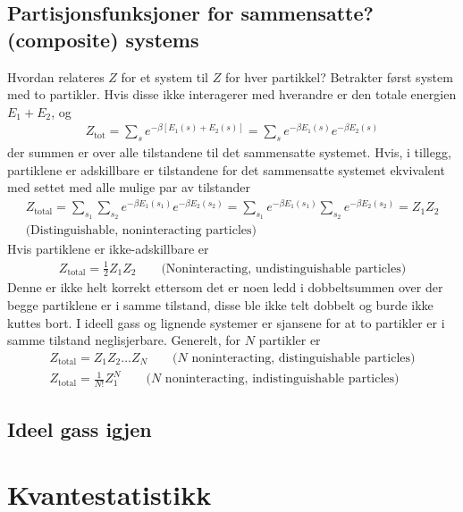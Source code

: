 \documentclass[12pt]{article}
\begin{document}
\subsection{Partisjonsfunksjoner for sammensatte? (composite) systems}
Hvordan relateres $Z$ for et system til $Z$ for hver partikkel? Betrakter først system med
to partikler. Hvis disse ikke interagerer med hverandre er den totale energien $E_1 + E_2$, og
\begin{align*}
  Z_\text{tot} = \sum_s e^{-\beta[E_1(s) + E_2(s)]} = \sum_s e^{-\beta E_1(s)} e^{-\beta E_2(s)}
\end{align*}
der summen er over alle tilstandene til det sammensatte systemet. Hvis, i tillegg,
partiklene er adskillbare er tilstandene for det sammensatte systemet ekvivalent med
settet med alle mulige par av tilstander
\begin{align*}
  Z_\text{total} = \sum_{s_1}\sum_{s_2} e^{-\beta E_1(s_1)} e^{-\beta E_2(s_2)} = \sum_{s_1} e^{-\beta E_1(s_1)} \sum_{s_2} e^{-\beta E_2(s_2)} = Z_1 Z_2 \\
  \text{(Distinguishable, noninteracting particles)}
\end{align*}
Hvis partiklene er ikke-adskillbare er
\begin{align*}
  Z_\text{total} = \frac{1}{2}Z_1 Z_2\qquad \text{(Noninteracting, undistinguishable particles)}
\end{align*}
Denne er ikke helt korrekt ettersom det er noen ledd i dobbeltsummen over der begge
partiklene er i samme tilstand, disse ble ikke telt dobbelt og burde ikke kuttes bort. I ideell
gass og lignende systemer er sjansene for at to partikler er i samme tilstand neglisjerbare.
Generelt, for $N$ partikler er
\begin{align*}
  Z_\text{total} = Z_1 Z_2 \hdots Z_N \qquad \text{($N$ noninteracting, distinguishable particles)} \\
  Z_\text{total} = \frac{1}{N!} Z_1^N \qquad \text{($N$ noninteracting, indistinguishable particles)}
\end{align*}
\subsection{Ideel gass igjen}
\section{Kvantestatistikk}
\end{document}
